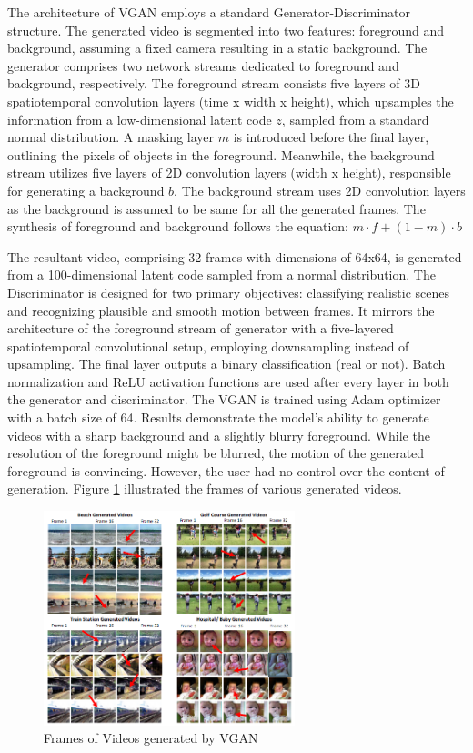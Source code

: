 \documentclass[12pt,twoside,a4paper,parskip]{scrbook} %
\begin{document}
The architecture of VGAN employs a standard Generator-Discriminator structure. The generated video is segmented into two features: foreground and background, assuming a fixed camera resulting in a static background. The generator comprises two network streams dedicated to foreground and background, respectively. The foreground stream consists five layers of 3D spatiotemporal convolution layers (time x width x height), which upsamples the information from a low-dimensional latent code $z$, sampled from a standard normal distribution. A masking layer $m$ is introduced before the final layer, outlining the pixels of objects in the foreground. Meanwhile, the background stream utilizes five layers of 2D convolution layers (width x height), responsible for generating a background $b$. The background stream uses 2D convolution layers as the background is assumed to be same for all the generated frames. The synthesis of foreground and background follows the equation: $m \cdot f + (1 - m) \cdot b$


The resultant video, comprising 32 frames with dimensions of 64x64, is generated from a 100-dimensional latent code sampled from a normal distribution. The Discriminator is designed for two primary objectives: classifying realistic scenes and recognizing plausible and smooth motion between frames. It mirrors the architecture of the foreground stream of generator with a five-layered spatiotemporal convolutional setup, employing downsampling instead of upsampling. The final layer outputs a binary classification (real or not). Batch normalization and ReLU activation functions are used after every layer in both the generator and discriminator. The VGAN is trained using Adam optimizer \cite{adam} with a batch size of 64. Results demonstrate the model's ability to generate videos with a sharp background and a slightly blurry foreground. While the resolution of the foreground might be blurred, the motion of the generated foreground is convincing. However, the user had no control over the content of generation. Figure \ref{fig:vgan} illustrated the frames of various generated videos.

\begin{figure}[H]
    \centering
    \includegraphics[width=0.65\textwidth]{Images/vgan.png}
    \caption{Frames of Videos generated by VGAN}
    \label{fig:vgan}
  \end{figure}
\end{document}
